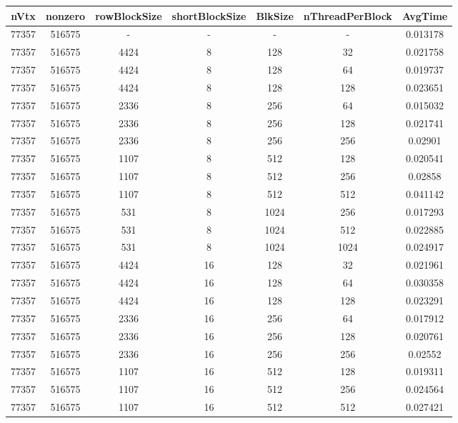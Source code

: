 \documentclass[9pt]{article}
\begin{document}
\SetBgPosition{0.25cm,-5.0cm}
\begin{tabular}{|c|c|c|c|c|c|c| }  
\hline
nVtx  & nonzero  & rowBlockSize  & shortBlockSize  & BlkSize  & nThreadPerBlock  & AvgTime \\
\hline
77357  & 516575  &  -  & -  & -  & -  &0.013178 \\
\hline
77357  & 516575  & 4424  & 8  & 128  & 32  & 0.021758 \\
\hline
77357  & 516575  & 4424  & 8  & 128  & 64  & 0.019737 \\
\hline
77357  & 516575  & 4424  & 8  & 128  & 128  & 0.023651 \\
\hline
77357  & 516575  & 2336  & 8  & 256  & 64  & 0.015032 \\
\hline
77357  & 516575  & 2336  & 8  & 256  & 128  & 0.021741 \\
\hline
77357  & 516575  & 2336  & 8  & 256  & 256  & 0.02901 \\
\hline
77357  & 516575  & 1107  & 8  & 512  & 128  & 0.020541 \\
\hline
77357  & 516575  & 1107  & 8  & 512  & 256  & 0.02858 \\
\hline
77357  & 516575  & 1107  & 8  & 512  & 512  & 0.041142 \\
\hline
77357  & 516575  & 531  & 8  & 1024  & 256  & 0.017293 \\
\hline
77357  & 516575  & 531  & 8  & 1024  & 512  & 0.022885 \\
\hline
77357  & 516575  & 531  & 8  & 1024  & 1024  & 0.024917 \\
\hline
77357  & 516575  & 4424  & 16  & 128  & 32  & 0.021961 \\
\hline
77357  & 516575  & 4424  & 16  & 128  & 64  & 0.030358 \\
\hline
77357  & 516575  & 4424  & 16  & 128  & 128  & 0.023291 \\
\hline
77357  & 516575  & 2336  & 16  & 256  & 64  & 0.017912 \\
\hline
77357  & 516575  & 2336  & 16  & 256  & 128  & 0.020761 \\
\hline
77357  & 516575  & 2336  & 16  & 256  & 256  & 0.02552 \\
\hline
77357  & 516575  & 1107  & 16  & 512  & 128  & 0.019311 \\
\hline
77357  & 516575  & 1107  & 16  & 512  & 256  & 0.024564 \\
\hline
77357  & 516575  & 1107  & 16  & 512  & 512  & 0.027421 \\

\end{tabular}
\end{document}

